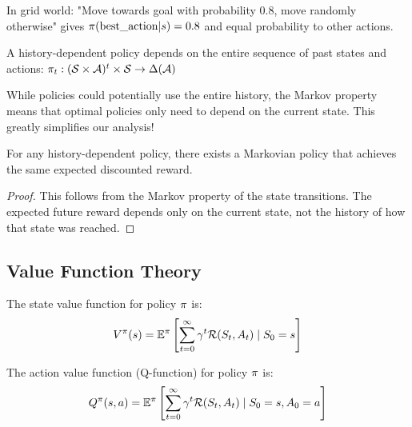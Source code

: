 \begin{examplebox}
In grid world: "Move towards goal with probability 0.8, move randomly otherwise" gives $\pi(\text{best\_action}|s) = 0.8$ and equal probability to other actions.
\end{examplebox}

\begin{definition}
A history-dependent policy depends on the entire sequence of past states and actions:
$\pi_t: (\mathcal{S} \times \mathcal{A})^t \times \mathcal{S} \to \Delta(\mathcal{A})$
\end{definition}

\begin{remarkbox}
While policies could potentially use the entire history, the Markov property means that optimal policies only need to depend on the current state. This greatly simplifies our analysis!
\end{remarkbox}

\begin{theorem}
For any history-dependent policy, there exists a Markovian policy that achieves the same expected discounted reward.
\end{theorem}

\begin{proof}
This follows from the Markov property of the state transitions. The expected future reward depends only on the current state, not the history of how that state was reached.
\end{proof}

\subsection{Value Function Theory}

\begin{definition}
The state value function for policy $\pi$ is:
\begin{equation}
V^\pi(s) = \mathbb{E}^\pi\left[\sum_{t=0}^\infty \gamma^t \mathcal{R}(S_t, A_t) \mid S_0 = s\right]
\end{equation}
\end{definition}

\begin{definition}
The action value function (Q-function) for policy $\pi$ is:
\begin{equation}
Q^\pi(s,a) = \mathbb{E}^\pi\left[\sum_{t=0}^\infty \gamma^t \mathcal{R}(S_t, A_t) \mid S_0 = s, A_0 = a\right]
\end{equation}
\end{definition}

